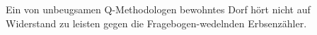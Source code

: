 Ein von unbeugsamen Q-Methodologen bewohntes Dorf hört nicht auf Widerstand zu leisten gegen die Fragebogen-wedelnden Erbsenzähler.